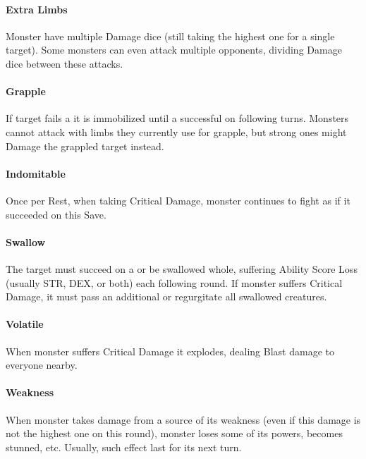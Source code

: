 \documentclass[itdr]{subfiles}
\begin{document}
\paragraph{Extra Limbs}
Monster have multiple Damage dice (still taking the highest one for a single target). Some monsters can even attack multiple opponents, dividing Damage dice between these attacks.

\paragraph{Grapple}
If target fails a  it is immobilized until a successful  on following turns. Monsters cannot attack with limbs they currently use for grapple, but strong ones might Damage the grappled target instead.

\paragraph{Indomitable}
Once per Rest, when taking Critical Damage, monster continues to fight as if it succeeded on this Save.

\paragraph{Swallow}
The target must succeed on a  or be swallowed whole, suffering Ability Score Loss (usually STR, DEX, or both) each following round. If monster suffers Critical Damage, it must pass an additional  or regurgitate all swallowed creatures.

\paragraph{Volatile}
When monster suffers Critical Damage it explodes, dealing Blast damage to everyone nearby.

\paragraph{Weakness}
When monster takes damage from a source of its weakness (even if this damage is not the highest one on this round), monster loses some of its powers, becomes stunned, etc. Usually, such effect last for its next turn.

\vfill
\break

\end{document}
